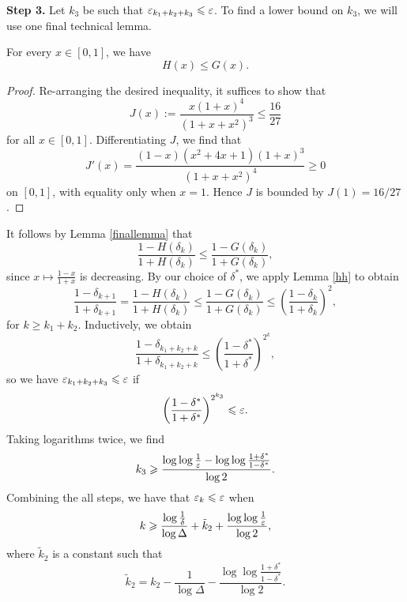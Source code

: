 \textbf{Step 3.} Let $k_3$ be such that $\varepsilon_{k_1+k_2+k_3} \leqslant \varepsilon$. To find a lower bound on $k_3$, we will use one final technical lemma.

\begin{lemma}\label{finallemma}
For every $x\in[0,1]$, we have
\[H(x)\leq G(x).\]
\end{lemma}

\begin{proof}
Re-arranging the desired inequality, it suffices to show that
\[J(x):=\dfrac{x(1+x)^4}{(1+x+x^2)^3} \leq \dfrac{16}{27}\]
for all $x \in [0,1]$. Differentiating $J$, we find that
\[J'(x) = \dfrac{(1-x)(x^2+4x+1)(1+x)^3}{(1+x+x^2)^4}\geq 0\]
on $[0,1]$, with equality only when $x=1$. Hence $J$ is bounded by $J(1)=16/27$.
\end{proof}

It follows by Lemma \ref{finallemma} that
\[\dfrac{1-H(\delta_{k})}{1+H(\delta_{k})} \leq \dfrac{1-G(\delta_{k})}{1+G(\delta_{k})},\]
since $x\mapsto \frac{1-x}{1+x}$ is decreasing. By our choice of $\delta^*$, we apply Lemma \ref{hh} to obtain
\[\dfrac{1-\delta_{k+1}}{1+\delta_{k+1}}=\dfrac{1-H(\delta_{k})}{1+H(\delta_{k})} \leq \dfrac{1-G(\delta_{k})}{1+G(\delta_{k})}\leq \left(\dfrac{1-\delta_{k}}{1+\delta_{k}}\right)^2,\]
for $k\geq k_1+k_2$. Inductively, we obtain
\[\dfrac{1-\delta_{k_1+k_2+k}}{1+\delta_{k_1+k_2+k}} \leq \left(\dfrac{1-\delta^*}{1+\delta^*}\right)^{2^k},\]
so we have $\varepsilon_{k_1+k_2+k_3} \leqslant \varepsilon$ if
\[\left(\dfrac{1-\delta^*}{1+\delta^*}\right)^{2^{k_3}} \leqslant \varepsilon.\]
Taking logarithms twice, we find
\[k_3 \geqslant \dfrac{\log\log\frac{1}{\varepsilon}-\log\log\frac{1+\delta^*}{1-\delta^*}}{\log 2}.\]
Combining the all steps, we have that $\varepsilon_k \leqslant \varepsilon$ when 
\begin{align}
    k \geqslant  \dfrac{\log \frac{1}{\delta}}{\log \Delta} + \tilde{k}_2 +\dfrac{\log\log\frac{1}{\varepsilon}}{\log 2}, \label{NUMBERITERS}
\end{align}
where $\tilde{k}_2$ is a constant such that
\[\tilde{k}_2 = k_2 - \dfrac{1}{\log \Delta}-\dfrac{\log\log\frac{1+\delta^*}{1-\delta^*}}{\log 2}.\]



